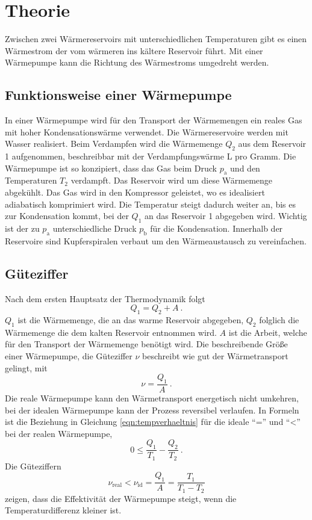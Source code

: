 \section{Theorie}
\label{sec:theorie}
Zwischen zwei Wärmereservoirs mit unterschiedlichen Temperaturen
gibt es einen Wärmestrom der vom wärmeren ins kältere Reservoir führt\cite{Anleitung}.
Mit einer Wärmepumpe kann die Richtung des Wärmestroms umgedreht werden.

\subsection{Funktionsweise einer Wärmepumpe}
In einer Wärmepumpe wird für den Transport der Wärmemengen ein reales Gas mit
hoher Kondensationswärme verwendet. Die Wärmereservoire werden mit Wasser realisiert.
Beim Verdampfen wird die Wärmemenge $Q_2$ aus dem Reservoir 1 aufgenommen,
beschreibbar mit der Verdampfungswärme L pro Gramm.
Die Wärmepumpe ist so konzipiert, dass das Gas beim Druck $p_\text{a}$ und den
Temperaturen $T_2$ verdampft. Das Reservoir wird um diese
Wärmemenge abgekühlt. Das Gas wird in den Kompressor geleistet,
wo es idealisiert adiabatisch komprimiert wird.
Die Temperatur steigt dadurch weiter an, bis es zur Kondensation kommt,
bei der $Q_1$ an das Reservoir 1 abgegeben wird. Wichtig ist der zu $p_\text{a}$ unterschiedliche
Druck $p_\text{b}$ für die Kondensation. Innerhalb der Reservoire
sind Kupferspiralen verbaut um den Wärmeaustausch zu vereinfachen.

\subsection{Güteziffer}
Nach dem ersten Hauptsatz der Thermodynamik folgt
\begin{equation}
      Q_1=Q_2+A\:.
      \label{eqn:thermoeins}
\end{equation}
$Q_1$ ist die Wärmemenge, die an das warme Reservoir abgegeben,
$Q_2$ folglich die Wärmemenge die dem kalten Reservoir entnommen wird.
$A$ ist die Arbeit, welche für den Transport der Wärmemenge benötigt wird.
Die beschreibende Größe einer Wärmepumpe, die Güteziffer $ν$ beschreibt wie gut
der Wärmetransport gelingt, mit
\begin{equation}
      ν = \frac{Q_1}{A}\:.
      \label{eqn:guete1}
\end{equation}
Die reale Wärmepumpe kann den Wärmetransport energetisch nicht umkehren,
bei der idealen Wärmepumpe kann der Prozess reversibel verlaufen.
In Formeln ist die Beziehung in Gleichung \ref{eqn:tempverhaeltnis}
für die ideale \enquote{=} und \enquote{<} bei der realen Wärmepumpe,
\begin{equation}
      0\leq\frac{Q_1}{T_1}-\frac{Q_2}{T_2}\:.
      \label{eqn:tempverhaeltnis}
\end{equation}
Die Güteziffern
\begin{equation}
      ν_\text{real}<ν_\text{id}=\frac{Q_1}{A}=\frac{T_1}{T_1-T_2}
      \label{eqn:guete2}
\end{equation}
zeigen, dass die Effektivität der Wärmepumpe steigt,
wenn die Temperaturdifferenz kleiner ist.

